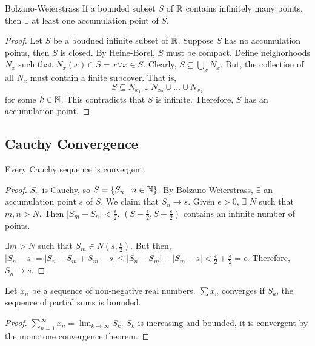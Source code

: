 \begin{theorem}{Bolzano-Weierstrass}{}
    If a bounded subset $S$ of $\mathbb{R}$ contains infinitely many points, then $\exists$ at least one accumulation point of $S$.
\end{theorem}
\begin{proof}
    Let $S$ be a boudned infinite subset of $\mathbb{R}$. Suppose $S$ has no accumulation points, then $S$ is closed. By Heine-Borel, $S$ must be compact. Define neighorhoods $N_x$ such that $N_x(x) \cap S = {x} \forall x \in S$. Clearly, $S \subseteq \bigcup_x N_x$. But, the collection of all $N_x$ must contain a finite subcover. That is, $$S \subseteq N_{x_1} \cup N_{x_2} \cup \ldots \cup N_{x_k}$$ for some $k \in \mathbb{N}$. This contradicts that $S$ is infinite. Therefore, $S$ has an accumulation point.
\end{proof}

\subsection{Cauchy Convergence}
\begin{theorem}{}{}
    Every Cauchy sequence is convergent.
\end{theorem}
\begin{proof}
    $S_n$ is Cauchy, so $S = \{S_n \mid n \in \mathbb{N}\}$. By Bolzano-Weierstrass, $\exists$ an accumulation point $s$ of $S$. We claim that $S_n \rightarrow s$. Given $\epsilon > 0$, $\exists$ $N$ such that $m, n > N$. Then $|S_m - S_n| < \frac{\epsilon}{2}$. $(S - \frac{\epsilon}{2}, S + \frac{\epsilon}{2})$ contains an infinite number of points. 
    
    $\exists m > N$ such that $S_m \in N(s, \frac{\epsilon}{2})$. But then, $|S_n - s| = |S_n - S_m + S_m - s| \leq |S_n - S_m| + |S_m - s| < \frac{\epsilon}{2} + \frac{\epsilon}{2} = \epsilon$. Therefore, $S_n \rightarrow s$.
\end{proof}

\begin{theorem}{}{}
    Let $x_n$ be a sequence of non-negative real numbers. $\sum x_n$ converges if $S_k$, the sequence of partial sums is bounded.
\end{theorem}
\begin{proof}
    $\sum_{n=1}^\infty x_n = \lim_{k \to \infty} S_k$. $S_k$ is increasing and bounded, it is convergent by the monotone convergence theorem.
\end{proof}